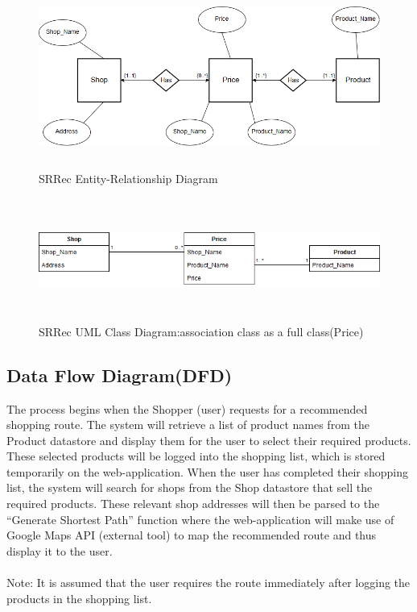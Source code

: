 \documentclass[12pt]{article}
\begin{document}
\begin{figure}[H]
  \includegraphics[width=\textwidth ,height=6cm]{ERD.png}
  \centering
  \caption{SRRec Entity-Relationship Diagram}
  \label{fig:Entity-Relationship Diagram}
\end{figure}

\begin{figure}[H]
  \includegraphics[width=\textwidth ,height=4cm]{ClassDiagram.png}
  \centering
  \caption{SRRec UML Class Diagram:association class as a full class(Price)}
  \label{fig:Class Diagram}
\end{figure}



\subsection{Data Flow Diagram(DFD)}
The process begins when the Shopper (user) requests for a recommended shopping route. The system will retrieve a list of product names from the Product datastore and display them for the user to select their required products. These selected products will be logged into the shopping list, which is stored temporarily on the web-application. When the user has completed their shopping list, the system will search for shops from the Shop datastore that sell the required products. These relevant shop addresses will then be parsed to the “Generate Shortest Path” function where the web-application will make use of Google Maps API (external tool) to map the recommended route and thus display it to the user.\\\\
Note: It is assumed that the user requires the route immediately after logging the products in the shopping list.\\
\end{document}
